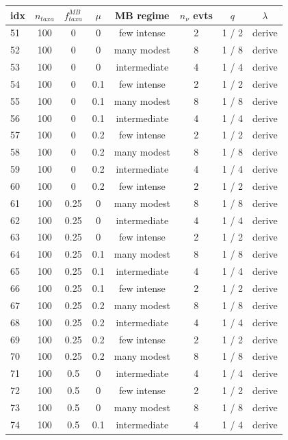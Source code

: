 \documentclass{article}
\begin{document}
\begin{table}
  \centering 
  \begin{tabular}{ l | c | c | c | c   c   c | c }
    \hline
idx & $n_{taxa}$ & $f_{taxa}^{MB}$ & $\mu$ & MB regime & $n_{\nu}$ evts & $q$ & $\lambda$ \\
    \hline
    \hline
51 & 100 & 0 & 0 & few intense & 2 & 1 / 2 & derive \\
52 & 100 & 0 & 0 & many modest  & 8 & 1 / 8 & derive \\
53 & 100 & 0 & 0 & intermediate & 4 & 1 / 4 & derive \\
54 & 100 & 0 & 0.1 & few intense & 2 & 1 / 2 & derive \\
55 & 100 & 0 & 0.1 & many modest  & 8 & 1 / 8 & derive \\
56 & 100 & 0 & 0.1 & intermediate & 4 & 1 / 4 & derive \\
57 & 100 & 0 & 0.2 & few intense & 2 & 1 / 2 & derive \\
58 & 100 & 0 & 0.2 & many modest  & 8 & 1 / 8 & derive \\
59 & 100 & 0 & 0.2 & intermediate & 4 & 1 / 4 & derive \\
60 & 100 & 0 & 0.2 & few intense & 2 & 1 / 2 & derive \\
61 & 100 & 0.25 & 0 & many modest  & 8 & 1 / 8 & derive \\
62 & 100 & 0.25 & 0 & intermediate & 4 & 1 / 4 & derive \\
63 & 100 & 0.25 & 0 & few intense & 2 & 1 / 2 & derive \\
64 & 100 & 0.25 & 0.1 & many modest  & 8 & 1 / 8 & derive \\
65 & 100 & 0.25 & 0.1 & intermediate & 4 & 1 / 4 & derive \\
66 & 100 & 0.25 & 0.1 & few intense & 2 & 1 / 2 & derive \\
67 & 100 & 0.25 & 0.2 & many modest  & 8 & 1 / 8 & derive \\
68 & 100 & 0.25 & 0.2 & intermediate & 4 & 1 / 4 & derive \\
69 & 100 & 0.25 & 0.2 & few intense & 2 & 1 / 2 & derive \\
70 & 100 & 0.25 & 0.2 & many modest  & 8 & 1 / 8 & derive \\
71 & 100 & 0.5 & 0 & intermediate & 4 & 1 / 4 & derive \\
72 & 100 & 0.5 & 0 & few intense & 2 & 1 / 2 & derive \\
73 & 100 & 0.5 & 0 & many modest  & 8 & 1 / 8 & derive \\
74 & 100 & 0.5 & 0.1 & intermediate & 4 & 1 / 4 & derive \\

\end{tabular}
\end{table}
\end{document}

